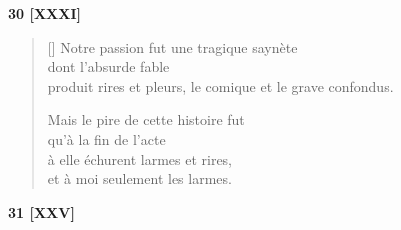 \documentclass[a4paper,12pt]{book}
\begin{document}
\bigskip

\begin{center}
  \textbf{30 [XXXI]}
\end{center}

\settowidth{\versewidth}{Notre passion fut une tragique saynète}

\begin{verse}[\versewidth]
  Notre passion fut une tragique saynète \\
  dont l'absurde fable \\
  produit rires et pleurs,
  le comique et le grave confondus.

  Mais le pire de cette histoire fut \\
  qu'à la fin de l'acte \\
  à elle échurent larmes et rires, \\
  et à moi seulement les larmes.
\end{verse}

\bigskip

\begin{center}
  \textbf{31 [XXV]}
\end{center}

\settowidth{\versewidth}{Quand t'enveloppent dans la nuit}
\end{document}
